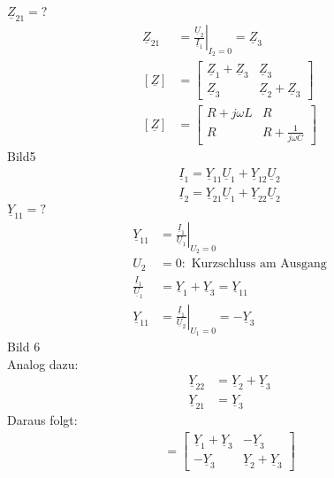 $\underline{Z}_{21}=?$\\
\begin{align}
	\underline{Z}_{21}&=\left.\frac{\underline{U}_2}{\underline{I}_1}\right|_{I_2=0}=\underline{Z}_3\nonumber\\
	[\underline{Z}]&=
	\begin{bmatrix}
		\underline{Z}_1+\underline{Z}_3 & \underline{Z}_3\\
		\underline{Z}_3 & \underline{Z}_2+\underline{Z}_3
	\end{bmatrix}\nonumber\\
	[\underline{Z}]&=
	\begin{bmatrix}
		R+j\omega L & R\\
		R & R+\frac{1}{j\omega C}
	\end{bmatrix}\nonumber
\end{align}
Bild5\\
\begin{align}
	\underline{I}_1=\underline{Y}_11\underline{U}_1+\underline{Y}_12\underline{U}_2\nonumber\\
	\underline{I}_2=\underline{Y}_21\underline{U}_1+\underline{Y}_22\underline{U}_2\nonumber
\end{align}
$\underline{Y}_{11}=?$\\
\begin{align}	
	\underline{Y}_{11}&=\left.\frac{\underline{I}_1}{\underline{U}_1}\right|_{U_2=0}\nonumber\\
	U_2&=0: \text{ Kurzschluss am Ausgang}\nonumber\\
	\frac{\underline{I}_1}{\underline{U}_1}&=\underline{Y}_1+\underline{Y}_3=\underline{Y}_{11}\nonumber\\
	\underline{Y}_{11}&=\left.\frac{\underline{I}_1}{\underline{U}_2}\right|_{U_1=0}=-\underline{Y}_3\nonumber
\end{align}
Bild 6\\
Analog dazu:\\
\begin{align}
	\underline{Y}_{22}&=\underline{Y}_2+\underline{Y}_3\nonumber\\
	\underline{Y}_{21}&=\underline{Y}_3\nonumber
\end{align}
Daraus folgt:
\begin{align}
	[\underline{Y}]=
	\begin{bmatrix}
		\underline{Y}_1+\underline{Y}_3 & -\underline{Y}_3\\
		-\underline{Y}_3 & \underline{Y}_2+\underline{Y}_3
	\end{bmatrix}\nonumber
\end{align}

